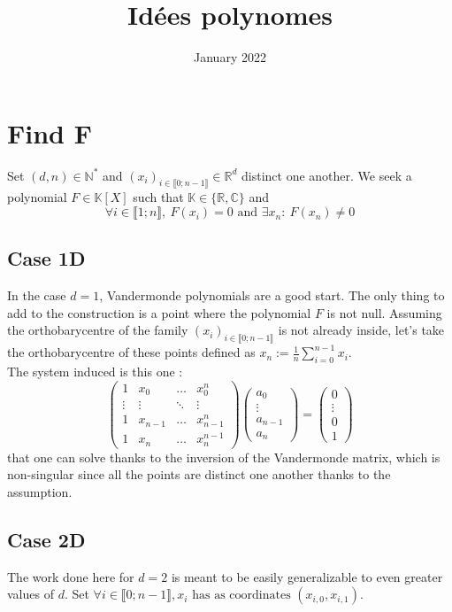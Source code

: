 \documentclass{article}
\title{Idées polynomes}
\date{January 2022}
\theoremstyle{definition}
\theoremstyle{property}
\theoremstyle{remark}
\begin{document}
	\section{Find F}
	Set $(d,n)\in \mathbb{N}^*$ and $(x_i)_{i\in \llbracket0;n-1\rrbracket }\in \mathbb{R}^{d}$ distinct one another. We seek a polynomial $F\in\mathbb{K}[X]$ such that $\mathbb{K} \in \{\mathbb{R},\mathbb{C}\}$ and
	$$\forall i\in \llbracket1;n\rrbracket,~F(x_i)=0 \text{ and } \exists x_n:~F(x_n)\neq0$$
	
	\subsection{Case 1D}
	In the case $d=1$, Vandermonde polynomials are a good start. The only thing to add to the construction is a point where the polynomial $F$ is not null. Assuming the orthobarycentre of the family $(x_i)_{i\in \llbracket0;n-1\rrbracket }$ is not already inside, let's take the orthobarycentre of these points defined as $x_n:=\frac{1}{n}\sum_{i=0}^{n-1} x_i$.\\
	The system induced is this one :
	\begin{equation*}
		\begin{pmatrix}
			1 & x_0 & \dots & x_{0}^{n} \\
			\vdots & \vdots & \ddots & \vdots\\
			1 & x_{n-1} & \dots & x_{n-1}^{n} \\
			1 & x_n & \dots & x_n^{n-1} 
		\end{pmatrix}
		\begin{pmatrix}
			a_0\\
			\vdots\\
			a_{n-1}\\
			a_{n}
		\end{pmatrix}
		=
		\begin{pmatrix}
			0\\
			\vdots\\
			0\\
			1
		\end{pmatrix}
	\end{equation*}
	that one can solve thanks to the inversion of the Vandermonde matrix, which is non-singular since all the points are distinct one another thanks to the assumption.
	
	
	\subsection{Case 2D}
	The work done here for $d=2$ is meant to be easily generalizable to even greater values of $d$.
	Set $\forall i \in \llbracket0;n-1\rrbracket, x_i \text{ has as coordinates }(x_{i,0},x_{i,1})$.
	
\end{document}
